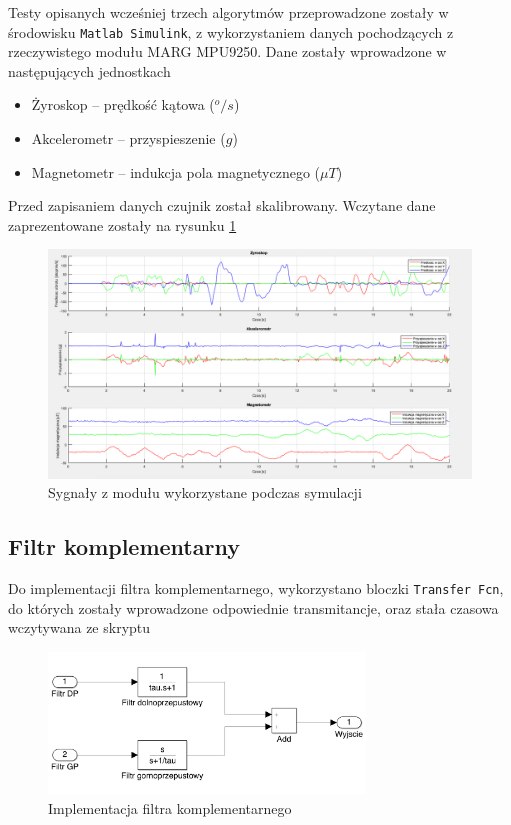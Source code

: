 Testy opisanych wcześniej trzech algorytmów przeprowadzone zostały w środowisku \texttt{Matlab Simulink}, z wykorzystaniem danych pochodzących z rzeczywistego modułu MARG MPU9250. Dane zostały wprowadzone w następujących jednostkach
\begin{itemize}
    \item Żyroskop -- prędkość kątowa ($^o/s$) 
    \item Akcelerometr -- przyspieszenie ($g$)
    \item Magnetometr -- indukcja pola magnetycznego ($\mu T$) 
\end{itemize}

Przed zapisaniem danych czujnik został skalibrowany. Wczytane dane zaprezentowane zostały na rysunku \ref{MARG sygnaly}
\begin{figure}[h!]
    \centering
    \includegraphics[width=1\textwidth]{Rysunki/Rozdzial04/MARG_sygnaly.png}
    \caption{Sygnały z modułu wykorzystane podczas symulacji}
    \label{MARG sygnaly}
\end{figure}

\subsection{Filtr komplementarny}

Do implementacji filtra komplementarnego, wykorzystano bloczki \texttt{Transfer Fcn}, do których zostały wprowadzone odpowiednie transmitancje, oraz stała czasowa wczytywana ze skryptu
\begin{figure}[h!]
    \centering
    \includegraphics[width=0.75\textwidth]{Rysunki/Rozdzial04/Filtr_komplementarny_implementacja.png}
    \caption{Implementacja filtra komplementarnego}
    \label{Komplementarny implementacja}
\end{figure}

